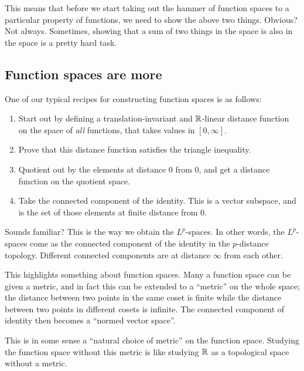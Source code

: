 \documentclass[a4paper]{amsart}
\begin{document}
This means that before we start taking out the hammer of function
spaces to a particular property of functions, we need to show the
above two things. Obvious? Not always. Sometimes, showing that a sum
of two things in the space is also in the space is a pretty hard task.

\subsection{Function spaces are more}

One of our typical recipes for constructing function spaces is as follows:

\begin{enumerate}

\item Start out by defining a translation-invariant and $\mathbb{R}$-linear
  distance function on the space of {\em all} functions, that takes
  values in $[0,\infty]$.

\item Prove that this distance function satisfies the triangle
  inequality.

\item Quotient out by the elements at distance $0$ from $0$, and get a
  distance function on the quotient space.

\item Take the connected component of the identity. This is a vector
  subspace, and is the set of those elements at finite distance from
  $0$.

\end{enumerate}

Sounds familiar? This is the way we obtain the $L^p$-spaces. In other
words, the $L^p$-spaces come as the connected component of the
identity in the $p$-distance topology. Different connected components
are at distance $\infty$ from each other.

This highlights something about function spaces. Many a function space
can be given a metric, and in fact this can be extended to a
``metric'' on the whole space; the distance between two points in the
same coset is finite while the distance between two points in
different cosets is infinite. The connected component of identity then
becomes a ``normed vector space''.

This is in some sense a ``natural choice of metric'' on the function
space. Studying the function space without this metric is like
studying $\mathbb{R}$ as a topological space without a metric.
\end{document}
